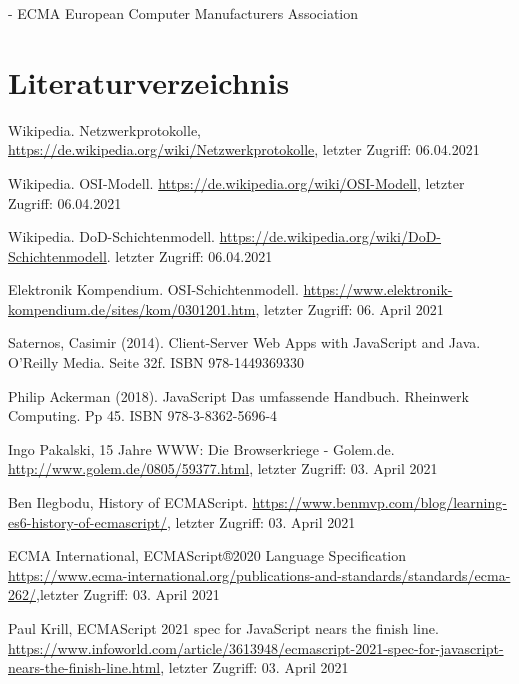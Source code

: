 \documentclass[11pt,a4paper]{article}
\begin{document}
- ECMA European Computer Manufacturers Association

\newpage


\clearpage
\section*{Literaturverzeichnis}
\begin{itemize}
%
%
%
%

 Wikipedia. Netzwerkprotokolle, \url{https://de.wikipedia.org/wiki/Netzwerkprotokolle}, letzter Zugriff: 06.04.2021

  Wikipedia. OSI-Modell. \url{https://de.wikipedia.org/wiki/OSI-Modell}, letzter Zugriff: 06.04.2021

 Wikipedia. DoD-Schichtenmodell. \url{https://de.wikipedia.org/wiki/DoD-Schichtenmodell}. letzter Zugriff: 06.04.2021

 Elektronik Kompendium. OSI-Schichtenmodell. \url{https://www.elektronik-kompendium.de/sites/kom/0301201.htm}, letzter Zugriff: 06. April 2021

%
%
%
%

 Saternos, Casimir (2014). Client-Server Web Apps with JavaScript and Java. O'Reilly Media. Seite 32f. ISBN 978-1449369330

 Philip Ackerman (2018). JavaScript Das umfassende Handbuch. Rheinwerk Computing. Pp 45. ISBN 978-3-8362-5696-4

 Ingo Pakalski, 15 Jahre WWW: Die Browserkriege - Golem.de. \url{http://www.golem.de/0805/59377.html}, letzter Zugriff: 03. April 2021

 Ben Ilegbodu, History of ECMAScript.
\url{https://www.benmvp.com/blog/learning-es6-history-of-ecmascript/}, letzter Zugriff: 03. April 2021

 ECMA International, ECMAScript®2020 Language Specification \url{https://www.ecma-international.org/publications-and-standards/standards/ecma-262/},letzter Zugriff: 03. April 2021

 Paul Krill, ECMAScript 2021 spec for JavaScript nears the finish line. \url{https://www.infoworld.com/article/3613948/ecmascript-2021-spec-for-javascript-nears-the-finish-line.html}, letzter Zugriff: 03. April 2021


\end{itemize}
\end{document}
